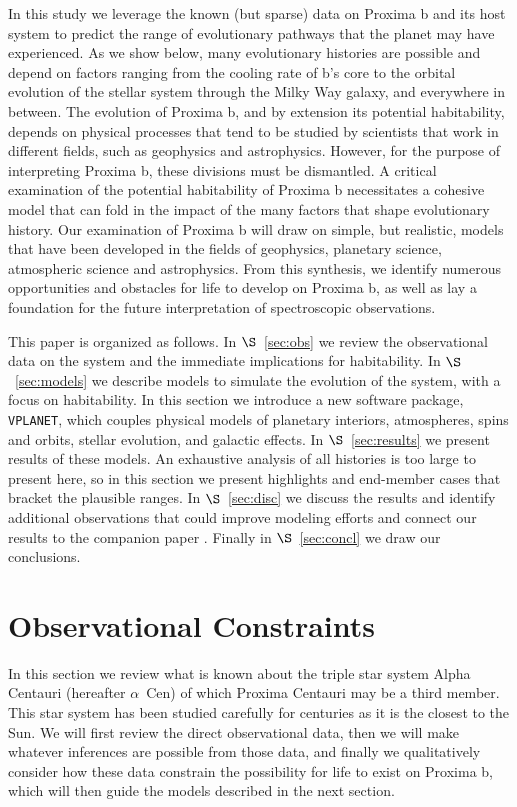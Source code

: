 \documentclass[preprint,12pt]{aastex}
\def\acen{{$\alpha$~Cen}}
\def\vplanet{\texttt{\footnotesize{VPLANET}}\xspace}
\begin{document}
In this study we leverage the known (but sparse) data on Proxima b and
its host system to predict the range of evolutionary pathways that the
planet may have experienced. As we show below, many evolutionary histories are
possible and depend on factors ranging from the cooling rate of b's
core to the orbital evolution of the stellar system through the Milky
Way galaxy, and everywhere in between. The evolution of Proxima b, and by
extension its potential habitability, depends on physical processes
that tend to be studied by scientists that work in different
fields, such as geophysics and astrophysics. However, for the purpose
of interpreting Proxima b, these divisions must be dismantled. A critical examination of the potential habitability of Proxima b necessitates
a cohesive model that can fold in the impact of the many factors that shape evolutionary
history. Our examination of Proxima b will draw on simple, but realistic, models
that have been developed in the fields of geophysics, planetary
science, atmospheric science and astrophysics. From this synthesis, we
identify numerous opportunities and obstacles for life to develop on
Proxima b, as well as lay a foundation for the future interpretation
of spectroscopic observations.

This paper is organized as follows. In $\S$~\ref{sec:obs} we review
the observational data on the system and the immediate implications
for habitability. In $\S$~\ref{sec:models} we describe models to
simulate the evolution of the system, with a focus on habitability. In
this section we introduce a new software package, \vplanet, which
couples physical models of planetary interiors, atmospheres, spins and
orbits, stellar evolution, and galactic effects. In
$\S$~\ref{sec:results} we present results of these models. An
exhaustive analysis of all histories is too large to present here, so
in this section we present highlights and end-member cases that
bracket the plausible ranges. In $\S$~\ref{sec:disc} we discuss the
results and identify additional observations that could improve
modeling efforts and connect our results to the companion paper
\citep{Meadows16}. Finally in $\S$~\ref{sec:concl} we draw our
conclusions.

\section{Observational Constraints \label{sec:obs}}

In this section we review what is known about the triple star system
Alpha Centauri (hereafter \acen) of which Proxima Centauri may be a
third member. This star system has been studied carefully for centuries as
it is the closest to the Sun. We will first review the direct
observational data, then we will make whatever inferences are possible
from those data, and finally we qualitatively consider how these data
constrain the possibility for life to exist on Proxima b, which will
then guide the models described in the next section.
\end{document}
